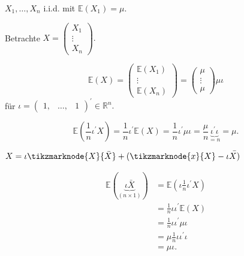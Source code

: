 \documentclass{tstextbook}
\begin{document}
\begin{example}
	
$X_{1},\ldots,X_{n}$ i.i.d. mit $\mathbb{E}\left(X_{1}\right)=\mu.$

Betrachte $X=\begin{pmatrix}X_{1}\\
	\vdots\\
	X_{n}
\end{pmatrix}.$

\[
\mathbb{E}(X)=\begin{pmatrix}\mathbb{E}(X_{1})\\
	\vdots\\
	\mathbb{E}(X_{n})
\end{pmatrix}= \begin{pmatrix}
	\mu \\ \vdots \\ \mu
\end{pmatrix}\mu\iota
\]
für $\iota=\begin{pmatrix}1, & \ldots, & 1\end{pmatrix}^{\prime}\in\mathbb{R}^{n}.$

\[
\mathbb{E}\left(\frac{1}{n}\iota^{\prime}X\right)=\frac{1}{n}\iota^{\prime}\mathbb{E}(X)=\frac{1}{n}\iota^{\prime}\mu\iota=\frac{\mu}{n}\underset{=n}{\underbrace{\iota^{\prime}\iota}}=\mu.
\]

\end{example}

\begin{remark}
$  
X =\iota\tikzmarknode{X}{\bar{X}}+(\tikzmarknode{x}{X}-\iota\bar{X)}$
\vspace{6ex}
\end{remark}

\begin{example}

\[
\begin{aligned}
\mathbb{E}(\underset{(n\times1)}{\underbrace{\iota\bar{X}}}) & =\mathbb{E}\left(\iota\frac{1}{n}\iota^{\prime}X\right)\\
 & =\frac{1}{n}\iota\iota^{\prime}\mathbb{E}(X)\\
 & =\frac{1}{n}\iota\iota^{\prime}\mu\iota\\
 & =\mu\frac{1}{n}\iota\iota^{\prime}\iota\\
 & =\mu\iota.
\end{aligned}
\]

\end{example}
\end{document}
